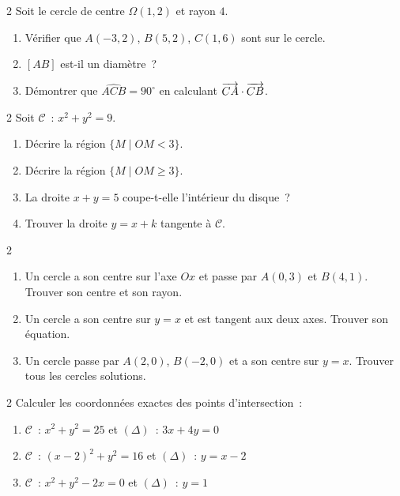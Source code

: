 \begin{exo}{2}
Soit le cercle de centre $\Omega(1,2)$ et rayon $4$.
\begin{enumerate}
  \item V\'erifier que $A(-3,2)$, $B(5,2)$, $C(1,6)$ sont sur le cercle.
  \item $[AB]$ est-il un diam\`etre~?
  \item D\'emontrer que $\widehat{ACB}=90^{\circ}$ en calculant $\overrightarrow{CA}\cdot\overrightarrow{CB}$.
\end{enumerate}
\end{exo}

\begin{exo}{2}
Soit $\mathcal{C}$~: $x^2+y^2=9$.
\begin{enumerate}
  \item D\'ecrire la r\'egion $\{M \mid OM < 3\}$.
  \item D\'ecrire la r\'egion $\{M \mid OM \geq 3\}$.
  \item La droite $x+y=5$ coupe-t-elle l'int\'erieur du disque~?
  \item Trouver la droite $y=x+k$ tangente \`a $\mathcal{C}$.
\end{enumerate}
\end{exo}

\begin{exo}{2}
\begin{enumerate}
  \item Un cercle a son centre sur l'axe $Ox$ et passe par $A(0,3)$
        et $B(4,1)$. Trouver son centre et son rayon.
  \item Un cercle a son centre sur $y=x$ et est tangent aux deux axes.
        Trouver son \'equation.
  \item Un cercle passe par $A(2,0)$, $B(-2,0)$ et a son centre
        sur $y=x$. Trouver tous les cercles solutions.
\end{enumerate}
\end{exo}

\begin{exo}{2}
Calculer les coordonn\'ees exactes des points d'intersection~:
\begin{enumerate}
  \item $\mathcal{C}$~: $x^2+y^2=25$ et $(\Delta)$~: $3x+4y=0$
  \item $\mathcal{C}$~: $(x-2)^2+y^2=16$ et $(\Delta)$~: $y=x-2$
  \item $\mathcal{C}$~: $x^2+y^2-2x=0$ et $(\Delta)$~: $y=1$
\end{enumerate}
\end{exo}

